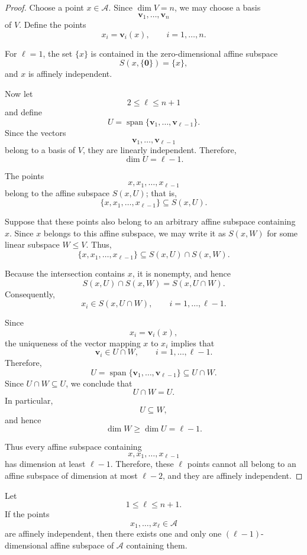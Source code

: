 \documentclass[12pt]{article}
\begin{document}
\begin{proof}
Choose a point \(x\in \mathcal A\). Since \(\dim V=n\), we may choose a basis
\[
\mathbf v_1,\ldots,\mathbf v_n
\]
of \(V\). Define the points
\[
x_i=\mathbf v_i(x),
\qquad i=1,\ldots,n.
\]

For \(\ell=1\), the set \(\{x\}\) is contained in the zero-dimensional
affine subspace
\[
S(x,\{\mathbf 0\})=\{x\},
\]
and \(x\) is affinely independent.

Now let
\[
2\leq \ell\leq n+1
\]
and define
\[
U=\operatorname{span}
\{\mathbf v_1,\ldots,\mathbf v_{\ell-1}\}.
\]
Since the vectors
\[
\mathbf v_1,\ldots,\mathbf v_{\ell-1}
\]
belong to a basis of \(V\), they are linearly independent. Therefore,
\[
\dim U=\ell-1.
\]

The points
\[
x,x_1,\ldots,x_{\ell-1}
\]
belong to the affine subspace \(S(x,U)\); that is,
\[
\{x,x_1,\ldots,x_{\ell-1}\}\subseteq S(x,U).
\]

Suppose that these points also belong to an arbitrary affine subspace
containing \(x\). Since \(x\) belongs to this affine subspace, we may
write it as \(S(x,W)\) for some linear subspace \(W\leq V\). Thus,
\[
\{x,x_1,\ldots,x_{\ell-1}\}
\subseteq S(x,U)\cap S(x,W).
\]

Because the intersection contains \(x\), it is nonempty, and hence
\[
S(x,U)\cap S(x,W)=S(x,U\cap W).
\]
Consequently,
\[
x_i\in S(x,U\cap W),
\qquad i=1,\ldots,\ell-1.
\]

Since
\[
x_i=\mathbf v_i(x),
\]
the uniqueness of the vector mapping \(x\) to \(x_i\) implies that
\[
\mathbf v_i\in U\cap W,
\qquad i=1,\ldots,\ell-1.
\]
Therefore,
\[
U
=\operatorname{span}
\{\mathbf v_1,\ldots,\mathbf v_{\ell-1}\}
\subseteq U\cap W.
\]
Since \(U\cap W\subseteq U\), we conclude that
\[
U\cap W=U.
\]
In particular,
\[
U\subseteq W,
\]
and hence
\[
\dim W\geq\dim U=\ell-1.
\]

Thus every affine subspace containing
\[
x,x_1,\ldots,x_{\ell-1}
\]
has dimension at least \(\ell-1\). Therefore, these \(\ell\) points cannot
all belong to an affine subspace of dimension at most \(\ell-2\), and
they are affinely independent.
\end{proof}

\begin{proposition}
Let
\[
1\leq \ell\leq n+1.
\]
If the points
\[
x_1,\ldots,x_\ell\in \mathcal A
\]
are affinely independent, then there exists one and only one
\((\ell-1)\)-dimensional affine subspace of \(\mathcal A\) containing them.
\end{proposition}
\end{document}
